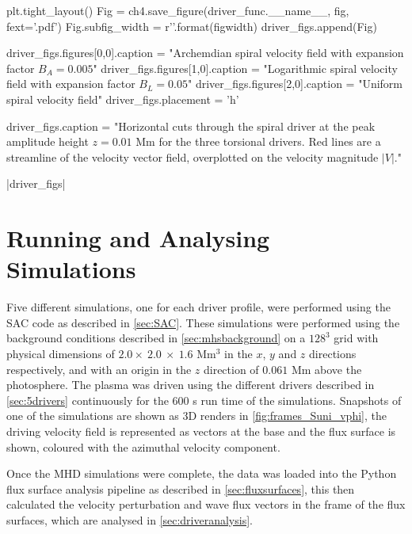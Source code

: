 \begin{pycode}[chapter4]
    plt.tight_layout()
    Fig = ch4.save_figure(driver_func.__name__, fig, fext='.pdf')
    Fig.subfig_width = r'{}\columnwidth'.format(figwidth)
    driver_figs.append(Fig)

driver_figs.figures[0,0].caption = "Archemdian spiral velocity field with expansion factor $B_A=0.005$"
driver_figs.figures[1,0].caption = "Logarithmic spiral velocity field with expansion factor $B_L=0.05$"
driver_figs.figures[2,0].caption = "Uniform spiral velocity field"
driver_figs.placement = 'h'

driver_figs.caption = "Horizontal cuts through the spiral driver at the peak amplitude height $z = 0.01$ Mm for the three torsional drivers. Red lines are a streamline of the velocity vector field, overplotted on the velocity magnitude $|V|$."
\end{pycode}

\py[chapter4]|driver_figs|

\section{Running and Analysing Simulations}

Five different simulations, one for each driver profile, were performed using the SAC code as described in \cref{sec:SAC}.
These simulations were performed using the background conditions described in \cref{sec:mhsbackground} on a $128^3$ grid with physical dimensions of $2.0 \times\ 2.0\ \times\ 1.6$ Mm$^3$ in the $x$, $y$ and $z$ directions respectively, and with an origin in the $z$ direction of $0.061$ Mm above the photosphere.
The plasma was driven using the different drivers described in \cref{sec:5drivers} continuously for the $600$ s run time of the simulations.
Snapshots of one of the simulations are shown as 3D renders in \cref{fig:frames_Suni_vphi}, the driving velocity field is represented as vectors at the base and the flux surface is shown, coloured with the azimuthal velocity component.

Once the MHD simulations were complete, the data was loaded into the Python flux surface analysis pipeline as described in \cref{sec:fluxsurfaces}, this then calculated the velocity perturbation and wave flux vectors in the frame of the flux surfaces, which are analysed in \cref{sec:driveranalysis}.

